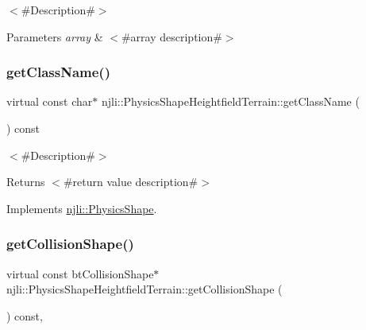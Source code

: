 $<$\#\+Description\#$>$


\begin{DoxyParams}{Parameters}
{\em array} & $<$\#array description\#$>$ \\
\hline
\end{DoxyParams}
\mbox{\label{classnjli_1_1_physics_shape_heightfield_terrain_a730f6ff1a72fc73f43c2daedf82b46e4}} 
\subsubsection{\texorpdfstring{get\+Class\+Name()}{getClassName()}}
{\footnotesize\ttfamily virtual const char$\ast$ njli\+::\+Physics\+Shape\+Heightfield\+Terrain\+::get\+Class\+Name (\begin{DoxyParamCaption}{ }\end{DoxyParamCaption}) const\hspace{0.3cm}{\ttfamily [virtual]}}

$<$\#\+Description\#$>$

\begin{DoxyReturn}{Returns}
$<$\#return value description\#$>$ 
\end{DoxyReturn}


Implements \mbox{\hyperlink{classnjli_1_1_physics_shape_a72cb98a55614a3e264b8e4a157b45c64}{njli\+::\+Physics\+Shape}}.

\mbox{\label{classnjli_1_1_physics_shape_heightfield_terrain_a2de5e5e8c2d159963c46664d7ec4ab10}} 
\subsubsection{\texorpdfstring{get\+Collision\+Shape()}{getCollisionShape()}\hspace{0.1cm}{\footnotesize\ttfamily [1/2]}}
{\footnotesize\ttfamily virtual const bt\+Collision\+Shape$\ast$ njli\+::\+Physics\+Shape\+Heightfield\+Terrain\+::get\+Collision\+Shape (\begin{DoxyParamCaption}{ }\end{DoxyParamCaption}) const\hspace{0.3cm}{\ttfamily [protected]}, {\ttfamily [virtual]}}



